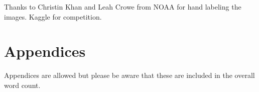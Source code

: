 \documentclass{IET}%
\begin{document}
Thanks to Christin Khan and Leah Crowe from NOAA for hand labeling the images. 
Kaggle for competition.



%
%
%
%
%
%
%
%
%
%
%
%
%
%
%
%
%
%
%
%
%
%
%
%
\section{Appendices}
%
Appendices are allowed but please be aware that these are included in the overall word count.
\end{document}
